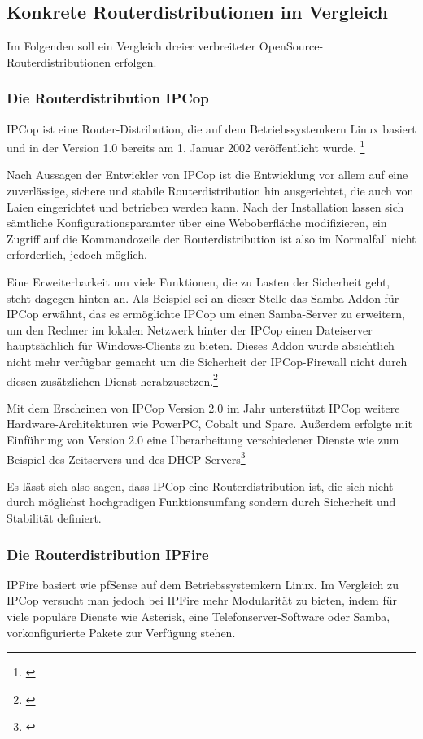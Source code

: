 \documentclass[a4paper,12pt]{scrartcl}
\begin{document}
\subsection{Konkrete Routerdistributionen im Vergleich}
Im Folgenden soll ein Vergleich dreier verbreiteter OpenSource-
Routerdistributionen erfolgen. 

\subsubsection{Die Routerdistribution IPCop}
IPCop ist eine Router-Distribution, die auf dem Betriebssystemkern Linux
basiert und in der Version 1.0 bereits am 1. Januar 2002 ver\"offentlicht
wurde. \footnote{\cite{IPCopManual}}

Nach Aussagen der Entwickler von IPCop ist die Entwicklung vor allem auf eine
zuverl\"assige, sichere und stabile Routerdistribution hin ausgerichtet, die
auch von Laien eingerichtet und betrieben werden kann. Nach der Installation
lassen sich s\"amtliche Konfigurationsparamter \"uber eine Weboberfl\"ache
modifizieren, ein Zugriff auf die Kommandozeile der Routerdistribution ist also
im Normalfall nicht erforderlich, jedoch m\"oglich. 

Eine Erweiterbarkeit um viele Funktionen, die zu Lasten der Sicherheit geht,
steht dagegen hinten an. Als Beispiel sei an dieser Stelle das Samba-Addon f\"ur
IPCop erw\"ahnt, das es erm\"oglichte IPCop um einen Samba-Server zu erweitern,
um den Rechner im lokalen Netzwerk hinter der IPCop einen Dateiserver
haupts\"achlich f\"ur Windows-Clients zu bieten. Dieses Addon wurde absichtlich
nicht mehr verf\"ugbar gemacht um die Sicherheit der IPCop-Firewall nicht durch
diesen zus\"atzlichen Dienst herabzusetzen.\footnote{\cite{IPCopSamba}}

Mit dem Erscheinen von IPCop Version 2.0 im Jahr unterst\"utzt IPCop weitere
Hardware-Architekturen wie PowerPC, Cobalt und
Sparc. Au\ss{}erdem erfolgte mit Einf\"uhrung
von Version 2.0 eine \"Uberarbeitung
verschiedener Dienste wie zum Beispiel des
Zeitservers und des DHCP-Servers\footnote{\cite{IPCop20Hardware}}

Es l\"asst sich also sagen, dass IPCop eine Routerdistribution ist, die sich
nicht durch m\"oglichst hochgradigen Funktionsumfang sondern durch Sicherheit
und Stabilit\"at definiert. 

\subsubsection{Die Routerdistribution IPFire}
IPFire basiert wie pfSense auf dem Betriebssystemkern Linux. Im Vergleich zu
IPCop versucht man jedoch bei IPFire mehr Modularit\"at zu bieten, indem f\"ur
viele popul\"are Dienste wie Asterisk, eine Telefonserver-Software oder Samba,
vorkonfigurierte Pakete zur Verf\"ugung stehen.
\end{document}
